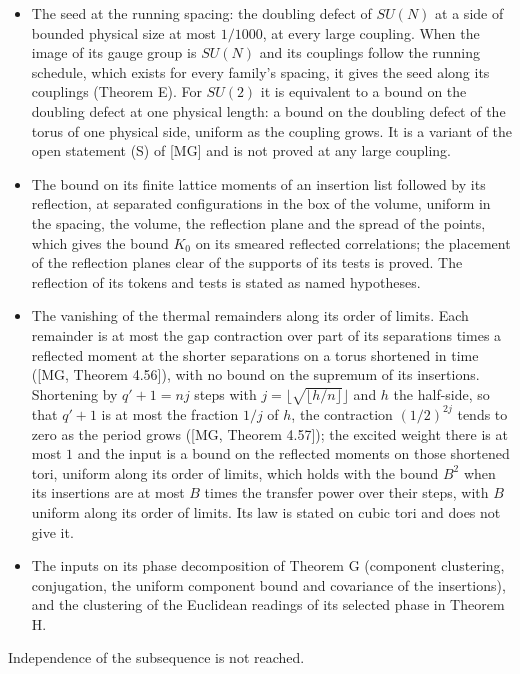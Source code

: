 \documentclass[10pt,letterpaper,twocolumn]{article}
\providecommand{\tightlist}{\setlength{\itemsep}{0pt}\setlength{\parskip}{0pt}}
\begin{document}
\begin{itemize}
\tightlist
\item
  The seed at the running spacing: the doubling defect of \(SU(N)\) at a side of bounded physical size at most \(1/1000\), at every large coupling. When the image of its gauge group is \(SU(N)\) and its couplings follow the running schedule, which exists for every family's spacing, it gives the seed along its couplings (Theorem E). For \(SU(2)\) it is equivalent to a bound on the doubling defect at one physical length: a bound on the doubling defect of the torus of one physical side, uniform as the coupling grows. It is a variant of the open statement (S) of {[}MG{]} and is not proved at any large coupling.
\item
  The bound on its finite lattice moments of an insertion list followed by its reflection, at separated configurations in the box of the volume, uniform in the spacing, the volume, the reflection plane and the spread of the points, which gives the bound \(K_0\) on its smeared reflected correlations; the placement of the reflection planes clear of the supports of its tests is proved. The reflection of its tokens and tests is stated as named hypotheses.
\item
  The vanishing of the thermal remainders along its order of limits. Each remainder is at most the gap contraction over part of its separations times a reflected moment at the shorter separations on a torus shortened in time ({[}MG, Theorem 4.56{]}), with no bound on the supremum of its insertions. Shortening by \(q'+1=nj\) steps with \(j=\lfloor\sqrt{\lfloor h/n\rfloor}\rfloor\) and \(h\) the half-side, so that \(q'+1\) is at most the fraction \(1/j\) of \(h\), the contraction \((1/2)^{2j}\) tends to zero as the period grows ({[}MG, Theorem 4.57{]}); the excited weight there is at most \(1\) and the input is a bound on the reflected moments on those shortened tori, uniform along its order of limits, which holds with the bound \(B^2\) when its insertions are at most \(B\) times the transfer power over their steps, with \(B\) uniform along its order of limits. Its law is stated on cubic tori and does not give it.
\item
  The inputs on its phase decomposition of Theorem G (component clustering, conjugation, the uniform component bound and covariance of the insertions), and the clustering of the Euclidean readings of its selected phase in Theorem H.
\end{itemize}

Independence of the subsequence is not reached.
\end{document}

